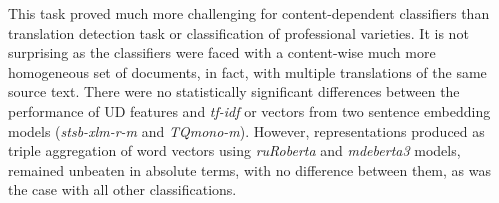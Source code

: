This task proved much more challenging for content-dependent classifiers than translation detection task or classification of professional varieties. It is not surprising as the classifiers were faced with a content-wise much more homogeneous set of documents, in fact, with multiple translations of the same source text. There were no statistically significant differences between the performance of UD features and \textit{tf-idf} or vectors from two sentence embedding models (\textit{stsb-xlm-r-m} and \textit{TQmono-m}).
However, representations produced as triple aggregation of word vectors using \textit{ruRoberta} and \textit{mdeberta3} models, remained unbeaten in absolute terms, with no difference between them, as was the case with all other classifications. 
